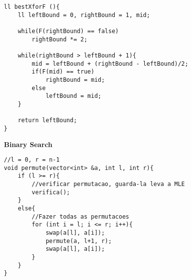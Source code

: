 \documentclass{article}
\begin{document}
\begin{multicols}{2}
\begin{lstlisting}
ll bestXforF (){
    ll leftBound = 0, rightBound = 1, mid;
    
    while(F(rightBound) == false)
        rightBound *= 2;

    while(rightBound > leftBound + 1){
        mid = leftBound + (rightBound - leftBound)/2;
        if(F(mid) == true)
            rightBound = mid;
        else    
            leftBound = mid;
    }

    return leftBound;
}
\end{lstlisting}

\large
\huge\textbf{Binary Search}
\large
\begin{lstlisting}
//l = 0, r = n-1
void permute(vector<int> &a, int l, int r){
	if (l >= r){
		//verificar permutacao, guarda-la leva a MLE
		verifica();
	}
	else{
		//Fazer todas as permutacoes
		for (int i = l; i <= r; i++){
			swap(a[l], a[i]);
			permute(a, l+1, r);
			swap(a[l], a[i]);
		}
	}
}
\end{lstlisting}

\end{multicols}
\end{document}
